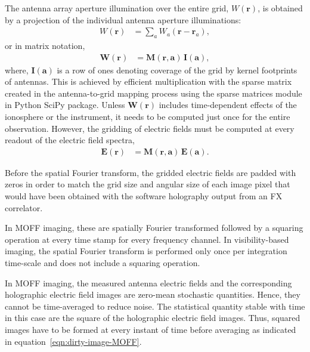 \documentclass[a4paper,fleqn,usenatbib]{mnras}
\begin{document}
\par\medskip
{}
\par\medskip
\noindent The antenna array aperture illumination over the entire grid, $W(\mathbf{r})$, is obtained by a projection of the individual antenna aperture illuminations:
\begin{align}\label{eqn:gridding-convolution}
  W(\mathbf{r}) &= \sum_a W_a(\mathbf{r}-\mathbf{r}_a),
\end{align}
or in matrix notation,
\begin{align}
  \mathbf{W}(\mathbf{r}) &= \mathbf{M}(\mathbf{r},\mathbf{a})\,\mathbf{I}(\mathbf{a}),
\end{align}
where, $\mathbf{I}(\mathbf{a})$ is a row of ones denoting coverage of the grid by kernel footprints of antennas. This is achieved by efficient multiplication with the sparse matrix created in the antenna-to-grid mapping process using the sparse matrices module in Python SciPy package. Unless $\mathbf{W}(\mathbf{r})$ includes time-dependent effects of the ionosphere or the instrument, it needs to be computed just once for the entire observation. However, the gridding of electric fields must be computed at every readout of the electric field spectra,
\begin{align}
  \mathbf{E}(\mathbf{r}) &= \mathbf{M}(\mathbf{r},\mathbf{a})\,\mathbf{E}(\mathbf{a}).
\end{align}

\par\medskip
{}
\par\medskip
\noindent Before the spatial Fourier transform, the gridded electric fields are padded with zeros in order to match the grid size and angular size of each image pixel that would have been obtained with the software holography output from an FX correlator. 

In MOFF imaging, these are spatially Fourier transformed followed by a squaring operation at every time stamp for every frequency channel. In visibility-based imaging, the spatial Fourier transform is performed only once per integration time-scale and does not include a squaring operation.

\par\medskip
{}
\par\medskip
\noindent In MOFF imaging, the measured antenna electric fields and the corresponding holographic electric field images are zero-mean stochastic quantities. Hence, they cannot be time-averaged to reduce noise. The statistical quantity stable with time in this case are the square of the holographic electric field images. Thus, squared images have to be formed at every instant of time before averaging as indicated in equation~\ref{eqn:dirty-image-MOFF}.
\end{document}
